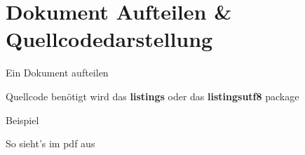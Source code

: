 \section{Dokument Aufteilen \& Quellcodedarstellung}
\begin{frame}{Ein Dokument aufteilen}
	\begin{Code}
	\centering
	\begin{minipage}{0.7\linewidth}
	
	\end{minipage}
	
	\end{Code}
\end{frame}
\begin{frame}{Quellcode}
	 benötigt wird das \textbf{listings} oder das \textbf{listingsutf8} package
	\begin{Code}
	\centering
	\begin{minipage}{0.9\linewidth}
	
	\end{minipage}	
	\end{Code}
\end{frame}
\begin{frame}{Beispiel}
	\begin{Code}
	\centering
	\begin{minipage}{0.9\linewidth}
	
	\end{minipage}	
	\end{Code}
\end{frame}

\begin{frame}{So sieht's im pdf aus}
\begin{Code}
	\centering
	\begin{minipage}{0.9\linewidth}
	
	\end{minipage}	
	\end{Code}
\end{frame}
